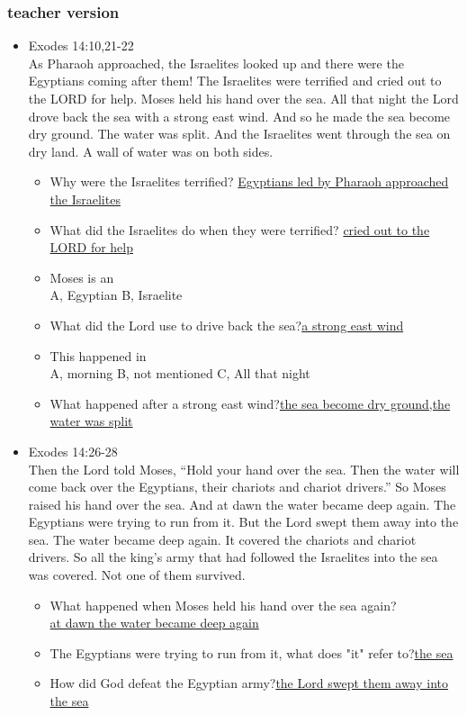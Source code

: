 \newpage
\subsubsection{teacher version}
\large
\begin{itemize}
\item Exodes 14:10,21-22\\
As Pharaoh approached, the Israelites looked up and there were the Egyptians coming after them! The Israelites were terrified and cried out to the LORD for help. Moses held his hand over the sea. All that night the Lord drove back the sea with a strong east wind. And so he made the sea become dry ground. The water was split. And the Israelites went through the sea on dry land. A wall of water was on both sides.
\begin{itemize}
\item Why were the Israelites terrified? \underline{Egyptians led by Pharaoh approached the Israelites}
\item What did the Israelites do when they were terrified? \underline{cried out to the LORD for help}
\item Moses is an \xdash[6em]  \\ %
A, Egyptian  \hspace{1cm} B, Israelite
\item What did the Lord use to drive back the sea?\underline{a strong east wind}
\item This happened in  \xdash[6em] \\
A, morning  \hspace{1cm} B, not mentioned\hspace{1cm} C, All that night
\item What happened after a strong east wind?\underline{the sea become dry ground,the water was split}
\end{itemize}

\item Exodes 14:26-28\\
Then the Lord told Moses, “Hold your hand over the sea. Then the water will come back over the Egyptians, their chariots and chariot drivers.” So Moses raised his hand over the sea. And at dawn the water became deep again. The Egyptians were trying to run from it. But the Lord swept them away into the sea. The water became deep again. It covered the chariots and chariot drivers. So all the king's army that had followed the Israelites into the sea was covered. Not one of them survived.
\begin{itemize}
\item What happened when Moses held his hand over the sea again?\\
\underline{at dawn the water became deep again}
\item The Egyptians were trying to run from it, what does "it" refer to?\underline{the sea}
\item How did God defeat the Egyptian army?\underline{the Lord swept them away into the sea}
\end{itemize}


\end{itemize}
